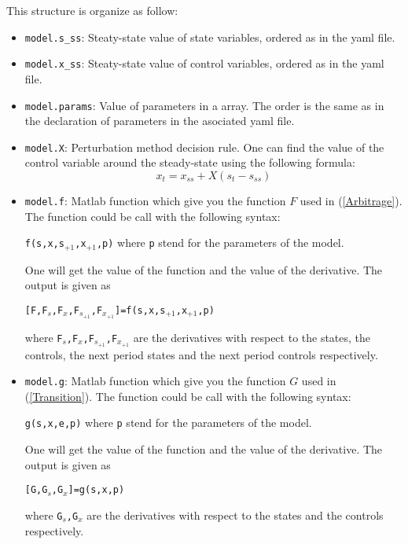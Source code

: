 \documentclass[12pt]{article}
\begin{document}
This structure is organize as follow:
\begin{itemize}
	\item \texttt{model.s\_ss}: Steaty-state value of state variables, ordered as in the yaml file.
	\item \texttt{model.x\_ss}: Steaty-state value of control variables, ordered as in the yaml file.
	\item \texttt{model.params}: Value of parameters in a array. The order is the same as in the declaration of parameters in the asociated yaml file.
	\item \texttt{model.X}: Perturbation method decision rule. One can find the value of the control variable around the steady-state using the following formula:
	\begin{equation*}
	x_t=x_{ss}+ X(s_t-s_{ss})
	\end{equation*}
	\item \texttt{model.f}: Matlab function which give you the function $F$ used in (\ref{Arbitrage}). The function could be call with the following syntax:
	
	 \begin{center} \texttt{f(s,x,s$_{+1}$,x$_{+1}$,p)} where \texttt{p} stend for the parameters of the model.\end{center}
	 
	 One will get the value of the function and the value of the derivative. The output is given as 
	 
	 \begin{center} \texttt{[F,F$_s$,F$_x$,F$_{s_{+1}}$,F$_{x_{+1}}$]=f(s,x,s$_{+1}$,x$_{+1}$,p)}\end{center} 
	 where \texttt{F$_s$,F$_x$,F$_{s_{+1}}$,F$_{x_{+1}}$} are the derivatives with respect to the states, the controls, the next period states and the next period controls respectively.
	
	\item \texttt{model.g}: Matlab function which give you the function $G$ used in (\ref{Transition}). The function could be call with the following syntax:
	
		 \begin{center} \texttt{g(s,x,e,p)} where \texttt{p} stend for the parameters of the model.\end{center}
	
		 One will get the value of the function and the value of the derivative. The output is given as 
	 
	 \begin{center} \texttt{[G,G$_s$,G$_x$]=g(s,x,p)}\end{center}
	 where \texttt{G$_s$,G$_x$} are the derivatives with respect to the states and the controls respectively.
	
	
	\end{itemize}
\end{document}
